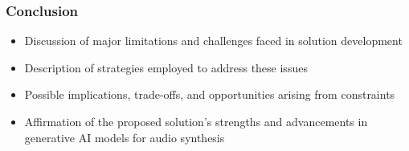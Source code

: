 \begin{frame}
    \frametitle{Conclusion}

    \begin{itemize}
        \item Discussion of major limitations and challenges faced in solution development
        \item Description of strategies employed to address these issues
        \item Possible implications, trade-offs, and opportunities arising from constraints
        \item Affirmation of the proposed solution's strengths and advancements in generative AI models for audio synthesis
    \end{itemize}
    
\end{frame}
